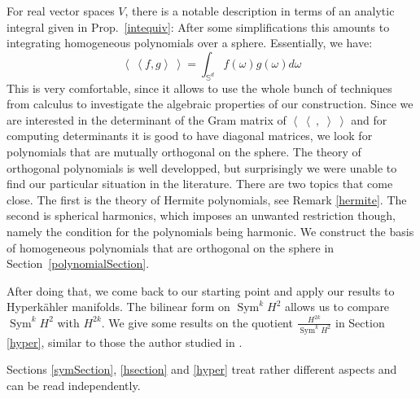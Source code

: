 \documentclass{amsart}
\DeclareMathOperator{\Sym}{Sym}
\newcommand{\bra}{\left<\!\!\!\:\left<}
\newcommand{\ket}{\right>\!\!\!\:\right>}
\renewcommand{\S}{\mathbb{S}}
\theoremstyle{plain}
\theoremstyle{definition}
\theoremstyle{remark}
\begin{document}
For real vector spaces $V$, there is a notable description in terms of an analytic integral given in Prop.~\ref{intequiv}: After some simplifications this amounts to integrating homogeneous polynomials over a sphere. Essentially, we have:
$$ \bra f,g\ket = \int_{\S^d} f(\omega)g(\omega)d\omega $$
This is very comfortable, since it allows to use the whole bunch of techniques from calculus to investigate the algebraic properties of our construction.
Since we are interested in the determinant of the Gram matrix of $\bra\ ,\;\ket$
and for computing determinants it is good to have diagonal matrices, we look for polynomials that are mutually orthogonal on the sphere. The theory of orthogonal polynomials is well developped, but surprisingly we were unable to find our particular situation in the literature. 
There are two topics that come close. The first is the theory of Hermite polynomials, see Remark \ref{hermite}. The second is spherical harmonics, which imposes an unwanted restriction though, namely the condition for the polynomials being harmonic.
We construct the basis of homogeneous polynomials that are orthogonal on the sphere in Section~\ref{polynomialSection}.

After doing that, we come back to our starting point and apply our results to Hyperk\"ahler manifolds. The bilinear form on $\Sym^kH^2$ allows us to compare $\Sym^kH^2$ with $H^{2k}$. We give some results on the quotient $\frac{H^{2k}}{\Sym^kH^2}$ in Section \ref{hyper}, similar to those the author studied in \cite{Kapfer}.

Sections \ref{symSection}, \ref{hsection} and \ref{hyper} treat rather different aspects and can be read independently.
\end{document}

